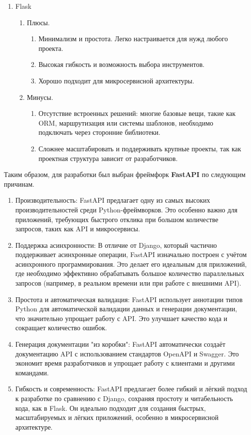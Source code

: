 \begin{enumerate}
	\item Flask
	\begin{enumerate}
		\item Плюсы.
		\begin{enumerate}
			\item Минимализм и простота. Легко настраивается для нужд любого проекта.
			\item Высокая гибкость и возможность выбора инструментов.
			\item Хорошо подходит для микросервисной архитектуры.
		\end{enumerate}

		\item Минусы.
		\begin{enumerate}
			\item Отсутствие встроенных решений: многие базовые вещи, такие как ORM, маршрутизация или системы шаблонов, необходимо подключать через сторонние библиотеки.
			\item Сложнее масштабировать и поддерживать крупные проекты, так как проектная структура зависит от разработчиков.
		\end{enumerate}
	\end{enumerate}
\end{enumerate}


Таким образом, для разработки был выбран фреймфорк \textbf{FastAPI} \cite{fastapi} по следующим причинам.

\begin{enumerate}
	\item Производительность: FastAPI предлагает одну из самых высоких производительностей среди Python-фреймворков. Это особенно важно для приложений, требующих быстрого отклика при большом количестве запросов, таких как API и микросервисы.
	\item Поддержка асинхронности: В отличие от Django, который частично поддерживает асинхронные операции, FastAPI изначально построен с учётом асинхронного программирования. Это делает его идеальным для приложений, где необходимо эффективно обрабатывать большое количество параллельных запросов (например, в реальном времени или при работе с внешними API).
	\item Простота и автоматическая валидация: FastAPI использует аннотации типов Python для автоматической валидации данных и генерации документации, что значительно упрощает работу с API. Это улучшает качество кода и сокращает количество ошибок.
	\item Генерация документации "из коробки": FastAPI автоматически создаёт документацию API с использованием стандартов OpenAPI и Swagger. Это экономит время разработчиков и упрощает работу с клиентами и другими командами.
	\item Гибкость и современность: FastAPI предлагает более гибкий и лёгкий подход к разработке по сравнению с Django, сохраняя простоту и читабельность кода, как в Flask. Он идеально подходит для создания быстрых, масштабируемых и лёгких приложений, особенно в микросервисной архитектуре.
\end{enumerate}


